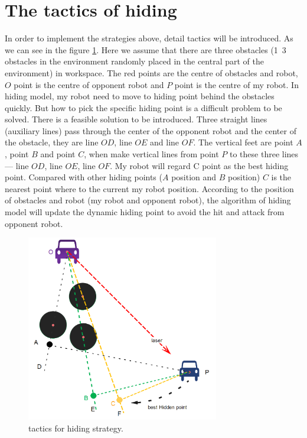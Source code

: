 \section{The tactics of hiding}
In order to implement the strategies above, detail tactics will be introduced. As we can see in the figure \ref{hiding_tactic}. Here we assume that there are three obstacles (1~3 obstacles in the environment randomly placed in the central part of the environment) in workspace. The red points are the centre of obstacles and robot,  $O$ point is the centre of opponent robot and $P$ point is the centre of my robot. In hiding model,  my robot need to move to hiding point behind the obstacles quickly. But how to pick the specific hiding point is a difficult problem to be solved. There is a feasible solution to be introduced.
Three straight lines (auxiliary lines) pass through the center of the opponent robot and the center of the obstacle, they are line $OD$, line $OE$ and line $OF$. The vertical feet are point $A$, point $B$ and point $C$, when make vertical lines from point $P$ to these three lines— line $OD$, line $OE$, line $OF$. My robot will regard C point as the best hiding point. Compared with other hiding points ($A$ position and $B$ position) $C$ is the nearest point where to the current my robot position. According to the position of obstacles and robot (my robot and opponent robot), the algorithm of hiding model will update the dynamic hiding point to avoid the hit and attack from opponent robot.

\begin{figure}[thb]
    \centering
    \includegraphics[width=0.75\textwidth]{images/PathPlaningHidingModel.png}
    \caption[an tactics for  hiding strategy]{tactics for  hiding strategy.}\label{hiding_tactic}
\end{figure}

